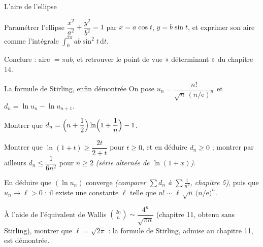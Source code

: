 \begin{exercice}[3]{L'aire de l'ellipse}
\begin{questions}
  \item Paramétrer l'ellipse $\dfrac{x^{2}}{a^{2}}+\dfrac{y^{2}}{b^{2}}=1$
    par $x=a\cos t$, $y=b\sin t$, et exprimer son aire comme l'intégrale
    $\displaystyle\int_{0}^{2\pi}ab\sin^{2}t\,\mathrm{d}t$.
  \item Conclure : aire $=\pi ab$, et retrouver le point de vue
    « déterminant » du chapitre 14.
\end{questions}
\end{exercice}

\begin{exercice}[3]{La formule de Stirling, enfin démontrée}
On pose $u_n=\dfrac{n!}{\sqrt n\,(n/\mathrm{e})^{n}}$ et
$d_n=\ln u_n-\ln u_{n+1}$.
\begin{questions}
  \item Montrer que $d_n=\Bigl(n+\dfrac12\Bigr)\ln\Bigl(1+\dfrac1n\Bigr)-1$.
  \item Montrer que $\ln(1+t)\geqslant\dfrac{2t}{2+t}$ pour $t\geqslant0$,
    et en déduire $d_n\geqslant0$ ; montrer par ailleurs
    $d_n\leqslant\dfrac{1}{6n^{2}}$ pour $n \geqslant 2$
    \emph{(série alternée de $\ln(1+x)$)}.
  \item En déduire que $(\ln u_n)$ converge
    \emph{(comparer $\sum d_n$ à $\sum\frac{1}{n^{2}}$, chapitre 5)}, puis
    que $u_n\to\ell>0$ : il existe une constante $\ell$ telle que
    $n!\sim\ell\,\sqrt n\,\bigl(n/\mathrm{e}\bigr)^{n}$.
  \item À l'aide de l'équivalent de Wallis
    $\binom{2n}{n}\sim\dfrac{4^{n}}{\sqrt{\pi n}}$ (chapitre 11, obtenu
    sans Stirling), montrer que $\ell=\sqrt{2\pi}$ : la formule de
    Stirling, admise au chapitre 11, est démontrée.
\end{questions}
\end{exercice}


